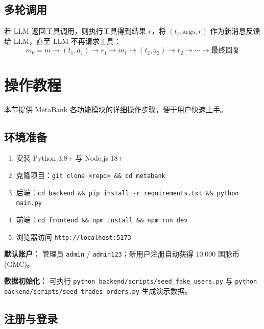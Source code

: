 \documentclass[12pt,a4paper]{article}
\begin{document}
\subsection{多轮调用}

若 LLM 返回工具调用，则执行工具得到结果 $r$，将 $(t_i, \mathrm{args}, r)$ 作为新消息反馈给 LLM，直至 LLM 不再请求工具：
\begin{equation}
m_0 = m \to (t_1, a_1) \to r_1 \to m_1 \to (t_2, a_2) \to r_2 \to \cdots \to \text{最终回复}
\end{equation}

\section{操作教程}

本节提供 MetaBank 各功能模块的详细操作步骤，便于用户快速上手。

\subsection{环境准备}

\begin{enumerate}
\item 安装 Python 3.8+ 与 Node.js 18+
\item 克隆项目：\texttt{git clone <repo> \&\& cd metabank}
\item 后端：\texttt{cd backend \&\& pip install -r requirements.txt \&\& python main.py}
\item 前端：\texttt{cd frontend \&\& npm install \&\& npm run dev}
\item 浏览器访问 \texttt{http://localhost:5173}
\end{enumerate}

\textbf{默认账户：} 管理员 \texttt{admin} / \texttt{admin123}；新用户注册自动获得 10,000 国脉币 (GMC)。

\textbf{数据初始化：} 可执行 \texttt{python backend/scripts/seed\_fake\_users.py} 与 \texttt{python backend/scripts/seed\_trades\_orders.py} 生成演示数据。

\subsection{注册与登录}
\end{document}
